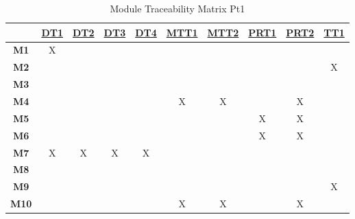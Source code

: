 \documentclass[12pt, titlepage]{article}
\begin{document}
\noindent
\begin{table}[H]
  \centering
  \begin{tabular}{|c|c|c|c|c|c|c|c|c|c|}
    \hline
                 & \hyperref[DT1]{DT1} & \hyperref[DT2]{DT2} & \hyperref[DT3]{DT3} & \hyperref[DT4]{DT4} & \hyperref[MTT1]{MTT1} & \hyperref[MTT2]{MTT2} & \hyperref[PRT1]{PRT1} & \hyperref[PRT2]{PRT2} & \hyperref[TT1]{TT1} \\
    \hline
    \textbf{M1}  & X                   &                     &                     &                     &                       &                       &                       &                       &                     \\ \hline
    \textbf{M2}  &                     &                     &                     &                     &                       &                       &                       &                       & X                   \\ \hline
    \textbf{M3}  &                     &                     &                     &                     &                       &                       &                       &                       &                     \\ \hline
    \textbf{M4}  &                     &                     &                     &                     & X                     & X                     &                       & X                     &                     \\ \hline
    \textbf{M5}  &                     &                     &                     &                     &                       &                       & X                     & X                     &                     \\ \hline
    \textbf{M6}  &                     &                     &                     &                     &                       &                       & X                     & X                     &                     \\ \hline
    \textbf{M7}  & X                   & X                   & X                   & X                   &                       &                       &                       &                       &                     \\ \hline
    \textbf{M8}  &                     &                     &                     &                     &                       &                       &                       &                       &                     \\ \hline
    \textbf{M9}  &                     &                     &                     &                     &                       &                       &                       &                       & X                   \\ \hline
    \textbf{M10} &                     &                     &                     &                     & X                     & X                     &                       & X                     &                     \\ \hline
  \end{tabular}
  \caption{ Module Traceability Matrix Pt1}
  \label{Table:A_Mod_trace}
\end{table}
\end{document}
